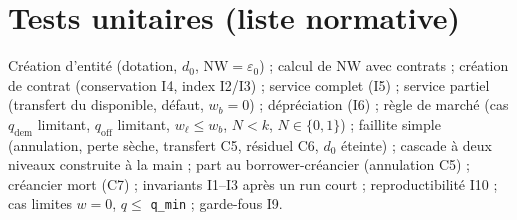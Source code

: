\documentclass[11pt,a4paper]{article}
\newcommand{\NW}{\mathrm{NW}}
\newcommand{\code}[1]{\texttt{#1}}
\begin{document}
\section{Tests unitaires (liste normative)}
Création d'entité (dotation, $d_0$, $\NW = \varepsilon_0$) ; calcul de
$\NW$ avec contrats ; création de contrat (conservation I4, index I2/I3) ;
service complet (I5) ; service partiel (transfert du disponible, défaut,
$w_b = 0$) ; dépréciation (I6) ; règle de marché (cas $q_{\mathrm{dem}}$
limitant, $q_{\mathrm{off}}$ limitant, $w_\ell \le w_b$, $N < k$, $N \in
\{0,1\}$) ; faillite simple (annulation, perte sèche, transfert C5,
résiduel C6, $d_0$ éteinte) ; cascade à deux niveaux construite à la main ;
part au borrower-créancier (annulation C5) ; créancier mort (C7) ;
invariants I1--I3 après un run court ; reproductibilité I10 ; cas limites
$w = 0$, $q \le$ \code{q\_min} ; garde-fous I9.
\end{document}
